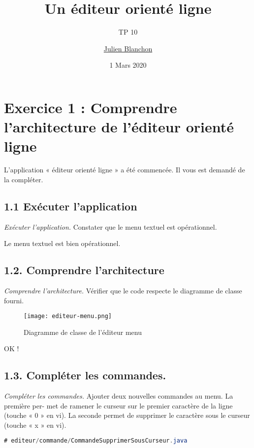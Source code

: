 \documentclass[
  french,
]{article}
\title{Un éditeur orienté ligne}
\subtitle{TP 10}
\author{\href{mailto:julien.blanchon@etu.toulouse-inp.fr}{Julien
Blanchon}}
\date{1 Mars 2020}
\begin{document}
\maketitle

\renewcommand*\contentsname{Table des matières}
{
\setcounter{tocdepth}{3}
\tableofcontents
}
\hypertarget{exercice-1-comprendre-larchitecture-de-luxe9diteur-orientuxe9-ligne}{%
\section{Exercice 1 : Comprendre l'architecture de l'éditeur orienté
ligne}\label{exercice-1-comprendre-larchitecture-de-luxe9diteur-orientuxe9-ligne}}

L'application « éditeur orienté ligne » a été commencée. Il vous est
demandé de la compléter.

\hypertarget{exuxe9cuter-lapplication}{%
\subsection{1.1 Exécuter l'application}\label{exuxe9cuter-lapplication}}

\emph{Exécuter l'application.} Constater que le menu textuel est
opérationnel.

Le menu textuel est bien opérationnel.

\hypertarget{comprendre-larchitecture}{%
\subsection{1.2. Comprendre
l'architecture}\label{comprendre-larchitecture}}

\emph{Comprendre l'architecture.} Vérifier que le code respecte le
diagramme de classe fourni.

\begin{figure}
\centering
\texttt{[image: editeur-menu.png]}
\caption{Diagramme de classe de l'éditeur menu}
\end{figure}

OK !

\hypertarget{compluxe9ter-les-commandes.}{%
\subsection{1.3. Compléter les
commandes.}\label{compluxe9ter-les-commandes.}}

\emph{Compléter les commandes.} Ajouter deux nouvelles commandes au
menu. La première per- met de ramener le curseur sur le premier
caractère de la ligne (touche « 0 » en vi). La seconde permet de
supprimer le caractère sous le curseur (touche « x » en vi).

\begin{lstlisting}[language=Java]
# editeur/commande/CommandeSupprimerSousCurseur.java
\end{lstlisting}
\end{document}
